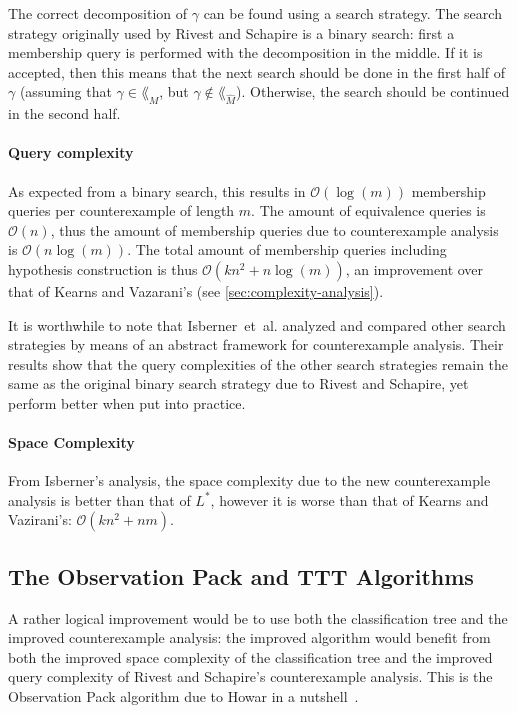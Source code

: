\documentclass[multi,crop=false,class=article]{standalone}
\begin{document}
The correct decomposition of $\gamma$ can be found using a search strategy. The
search strategy originally used by Rivest and Schapire is a binary search: first
a membership query is performed with the decomposition in the middle. If it is
accepted, then this means that the next search should be done in the first half
of $\gamma$ (assuming that $\gamma \in \lang_M$, but
$\gamma \not\in \lang_{\hat M}$). Otherwise, the search should be continued in
the second half.

\paragraph{Query complexity} As expected from a binary search, this results in
$\mathcal{O}(\log(m))$ membership queries per counterexample of length $m$. The
amount of equivalence queries is $\mathcal{O}(n)$, thus the amount of membership
queries due to counterexample analysis is $\mathcal{O}(n\log(m))$. The total
amount of membership queries including hypothesis construction is thus
$\mathcal{O}(kn^2 + n\log(m))$, an improvement over that of Kearns and
Vazarani's (see \cref{sec:complexity-analysis}).

It is worthwhile to note that Isberner~et~al. analyzed and compared other search
strategies by means of an abstract framework for counterexample
analysis\cite{Isberner2014a}. Their results show that the query complexities of
the other search strategies remain the same as the original binary search
strategy due to Rivest and Schapire, yet perform better when put into practice.

\paragraph{Space Complexity} From Isberner's analysis\cite{Isberner2014b}, the
space complexity due to the new counterexample analysis is better than that of
$L^*$, however it is worse than that of Kearns and Vazirani's:
$\mathcal{O}(kn^2 + nm)$.

\subsection{The Observation Pack and TTT Algorithms}
\label{sec:ttt}
A rather logical improvement would be to use both the classification tree and
the improved counterexample analysis: the improved algorithm would benefit from
both the improved space complexity of the classification tree and the improved
query complexity of Rivest and Schapire's counterexample analysis. This is the
Observation Pack algorithm due to Howar in a
nutshell~\cite{Howar2012a,Isberner2015a}.
\end{document}
